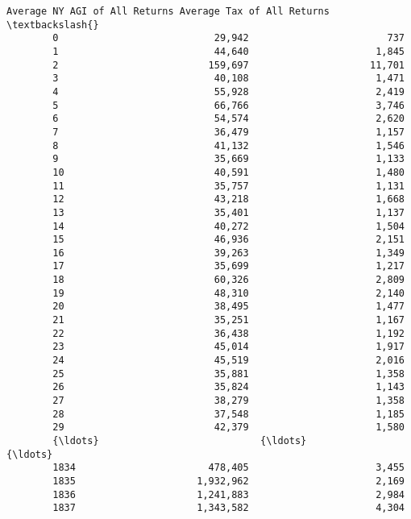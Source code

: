\documentclass[11pt]{article}
\begin{document}
\begin{Verbatim}[commandchars=\\\{\}]
             Average NY AGI of All Returns Average Tax of All Returns  \textbackslash{}
        0                           29,942                        737   
        1                           44,640                      1,845   
        2                          159,697                     11,701   
        3                           40,108                      1,471   
        4                           55,928                      2,419   
        5                           66,766                      3,746   
        6                           54,574                      2,620   
        7                           36,479                      1,157   
        8                           41,132                      1,546   
        9                           35,669                      1,133   
        10                          40,591                      1,480   
        11                          35,757                      1,131   
        12                          43,218                      1,668   
        13                          35,401                      1,137   
        14                          40,272                      1,504   
        15                          46,936                      2,151   
        16                          39,263                      1,349   
        17                          35,699                      1,217   
        18                          60,326                      2,809   
        19                          48,310                      2,140   
        20                          38,495                      1,477   
        21                          35,251                      1,167   
        22                          36,438                      1,192   
        23                          45,014                      1,917   
        24                          45,519                      2,016   
        25                          35,881                      1,358   
        26                          35,824                      1,143   
        27                          38,279                      1,358   
        28                          37,548                      1,185   
        29                          42,379                      1,580   
        {\ldots}                            {\ldots}                        {\ldots}   
        1834                       478,405                      3,455   
        1835                     1,932,962                      2,169   
        1836                     1,241,883                      2,984   
        1837                     1,343,582                      4,304   

\end{Verbatim}
\end{document}
